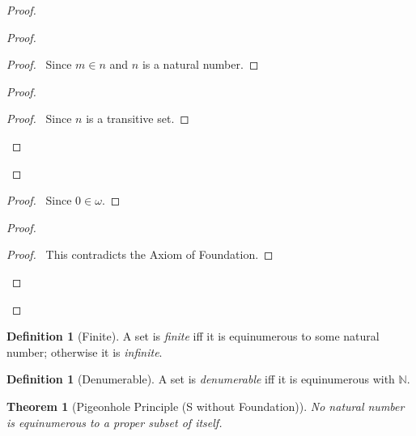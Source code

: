\documentclass{book}
\let\qed\relax
\newtheorem{thm}[ax]{Theorem}
\theoremstyle{definition}
\newtheorem{df}[ax]{Definition}
\begin{document}
\begin{proof}
\pf
{}
\begin{proof}
	\begin{proof}
		\pf\ Since $m \in n$ and $n$ is a natural number.
	\end{proof}
	\begin{proof}
		\begin{proof}
			\pf\ Since $n$ is a transitive set.
		\end{proof}
	\end{proof}
\end{proof}
\begin{proof}
	\pf\ Since $0 \in \omega$.
\end{proof}
\begin{proof}
	\qedstep
	\begin{proof}
		\pf\ This contradicts the Axiom of Foundation.
	\end{proof}
\end{proof}
\qed
\end{proof}

\begin{df}[Finite]
A set is \emph{finite} iff it is equinumerous to some natural number; otherwise it is \emph{infinite}.
\end{df}

\begin{df}[Denumerable]
A set is \emph{denumerable} iff it is equinumerous with $\mathbb{N}$.
\end{df}

\begin{thm}[Pigeonhole Principle (S without Foundation)]
No natural number is equinumerous to a proper subset of itself.
\end{thm}
\end{document}
